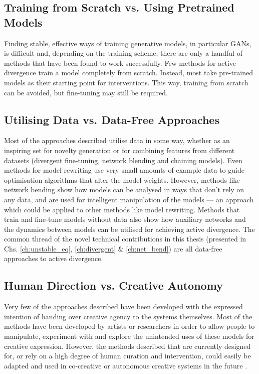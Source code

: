\subsection{Training from Scratch vs. Using Pretrained Models}

Finding stable, effective ways of training generative models, in particular GANs, is difficult and, depending on the training scheme, there are only a handful of methods that have been found to work successfully. Few methods for active divergence train a model completely from scratch. Instead, most take pre-trained models as their starting point for interventions. This way, training from scratch can be avoided, but fine-tuning may still be required. 


\subsection{Utilising Data vs. Data-Free Approaches}
\label{c6:subsec:datafree}

Most of the approaches described utilise data in some way, whether as an inspiring set for novelty generation or for combining features from different datasets (divergent fine-tuning, network blending and chaining models). 
Even methods for model rewriting use very small amounts of example data to guide optimisation algorithms that alter the model weights. 
However, methods like network bending show how models can be analysed in ways that don't rely on any data, and are used for intelligent manipulation of the models --- an approach which could be applied to other methods like model rewriting. 
Methods that train and fine-tune models without data also show how auxiliary networks and the dynamics between models can be utilised for achieving active divergence.
The common thread of the novel technical contributions in this thesis (presented in Chs. \ref{ch:unstable_eq}, \ref{ch:divergent} \& \ref{ch:net_bend}) are all data-free approaches to active divergence.

\subsection{Human Direction vs. Creative Autonomy}
Very few of the approaches described have been developed with the expressed intention of handing over creative agency to the systems themselves. Most of the methods have been developed by artists or researchers in order to allow people to manipulate, experiment with and explore the unintended uses of these models for creative expression. However, the methods described that are currently designed for, or rely on a high degree of human curation and intervention, could easily be adapted and used in co-creative or autonomous creative systems in the future \citep{berns2021automating}.

